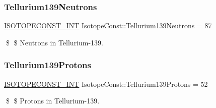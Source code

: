 \subsubsection{\texorpdfstring{Tellurium139\+Neutrons}{Tellurium139Neutrons}}
{\footnotesize\ttfamily \mbox{\hyperlink{group___isotope_const-_macros_ga5f18360b3e99483a35c32d789e62621c}{I\+S\+O\+T\+O\+P\+E\+C\+O\+N\+S\+T\+\_\+\+I\+NT}} Isotope\+Const\+::\+Tellurium139\+Neutrons = 87}

\$ \$ Neutrons in Tellurium-\/139. \mbox{\label{group___isotope_const-_tellurium-_te139_gadfbfaba3661bfaf025f2e435c298d641}} 
\subsubsection{\texorpdfstring{Tellurium139\+Protons}{Tellurium139Protons}}
{\footnotesize\ttfamily \mbox{\hyperlink{group___isotope_const-_macros_ga5f18360b3e99483a35c32d789e62621c}{I\+S\+O\+T\+O\+P\+E\+C\+O\+N\+S\+T\+\_\+\+I\+NT}} Isotope\+Const\+::\+Tellurium139\+Protons = 52}

\$ \$ Protons in Tellurium-\/139. 